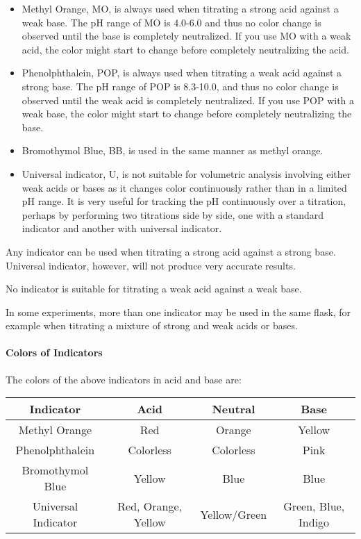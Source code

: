 \begin{itemize}

\item{Methyl Orange, MO, is always used when titrating a strong acid against a weak base. The pH range of MO is 4.0-6.0 and thus no color change is observed until the base is completely neutralized. If you use MO with a weak acid, the color might start to change before completely neutralizing the acid.}

\item{Phenolphthalein, POP, is always used when titrating a weak acid against a strong base. The pH range of POP is 8.3-10.0, and thus no color change is observed until the weak acid is completely neutralized. If you use POP with a weak base, the color might start to change before completely neutralizing the base.}

\item{Bromothymol Blue, BB, is used in the same manner as methyl orange.}

\item{Universal indicator, U, is not suitable for volumetric analysis involving either weak acids or bases as it changes color continuously rather than in a limited pH range. It is very useful for tracking the pH continuously over a titration, perhaps by performing two titrations side by side, one with a standard indicator and another with universal indicator.}

\end{itemize}

Any indicator can be used when titrating a strong acid against a strong base. Universal indicator, however, will not produce very accurate results.

No indicator is suitable for titrating a weak acid against a weak base.

In some experiments, more than one indicator may be used in the same flask, for example when titrating a mixture of strong and weak acids or bases.

\paragraph{Colors of Indicators}
The colors of the above indicators in acid and base are:

\begin{center}
\begin{tabular}{| c | c | c | c |}
\hline
Indicator & Acid & Neutral & Base \\ \hline
Methyl Orange & Red & Orange & Yellow \\ \hline
Phenolphthalein & Colorless & Colorless & Pink \\ \hline
Bromothymol Blue & Yellow & Blue & Blue \\ \hline
Universal Indicator & Red, Orange, Yellow & Yellow/Green & Green, Blue, Indigo  \\
\hline
\end{tabular}
\end{center}

